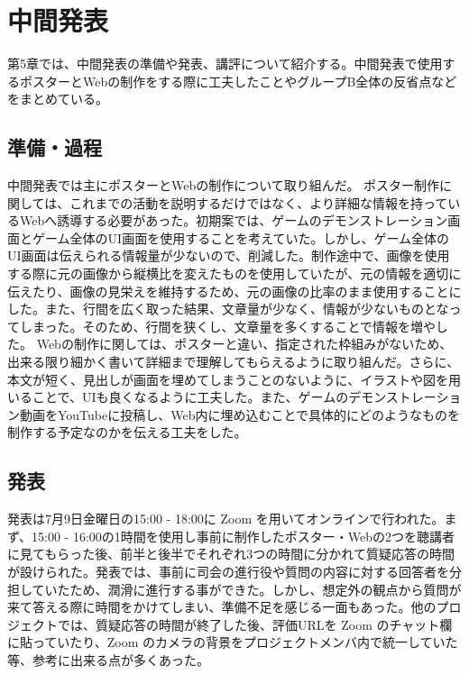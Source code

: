 \chapter{中間発表}
第5章では、中間発表の準備や発表、講評について紹介する。中間発表で使用するポスターとWebの制作をする際に工夫したことやグループB全体の反省点などをまとめている。
\section{準備・過程}
中間発表では主にポスターとWebの制作について取り組んだ。
ポスター制作に関しては、これまでの活動を説明するだけではなく、より詳細な情報を持っているWebへ誘導する必要があった。初期案では、ゲームのデモンストレーション画面とゲーム全体のUI画面を使用することを考えていた。しかし、ゲーム全体のUI画面は伝えられる情報量が少ないので、削減した。制作途中で、画像を使用する際に元の画像から縦横比を変えたものを使用していたが、元の情報を適切に伝えたり、画像の見栄えを維持するため、元の画像の比率のまま使用することにした。また、行間を広く取った結果、文章量が少なく、情報が少ないものとなってしまった。そのため、行間を狭くし、文章量を多くすることで情報を増やした。
Webの制作に関しては、ポスターと違い、指定された枠組みがないため、出来る限り細かく書いて詳細まで理解してもらえるように取り組んだ。さらに、本文が短く、見出しが画面を埋めてしまうことのないように、イラストや図を用いることで、UIも良くなるように工夫した。また、ゲームのデモンストレーション動画をYouTubeに投稿し、Web内に埋め込むことで具体的にどのようなものを制作する予定なのかを伝える工夫をした。

\section{発表}
発表は7月9日金曜日の15:00 - 18:00に Zoom を用いてオンラインで行われた。まず、15:00 - 16:00の1時間を使用し事前に制作したポスター・Webの2つを聴講者に見てもらった後、前半と後半でそれぞれ3つの時間に分かれて質疑応答の時間が設けられた。発表では、事前に司会の進行役や質問の内容に対する回答者を分担していたため、潤滑に進行する事ができた。しかし、想定外の観点から質問が来て答える際に時間をかけてしまい、準備不足を感じる一面もあった。他のプロジェクトでは、質疑応答の時間が終了した後、評価URLを Zoom のチャット欄に貼っていたり、Zoom のカメラの背景をプロジェクトメンバ内で統一していた等、参考に出来る点が多くあった。

\newpage
